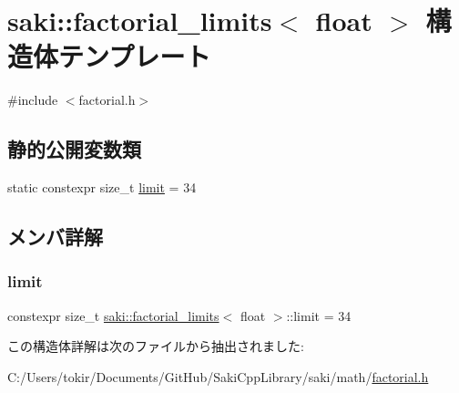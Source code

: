 \hypertarget{structsaki_1_1factorial__limits_3_01float_01_4}{}\section{saki\+:\+:factorial\+\_\+limits$<$ float $>$ 構造体テンプレート}
\label{structsaki_1_1factorial__limits_3_01float_01_4}


{\ttfamily \#include $<$factorial.\+h$>$}

\subsection*{静的公開変数類}
\begin{DoxyCompactItemize}
\item 
static constexpr size\+\_\+t \mbox{\hyperlink{structsaki_1_1factorial__limits_3_01float_01_4_a0ae26b8bc828a91c8e886ce9ba99ad13}{limit}} = 34
\end{DoxyCompactItemize}


\subsection{メンバ詳解}
\mbox{\label{structsaki_1_1factorial__limits_3_01float_01_4_a0ae26b8bc828a91c8e886ce9ba99ad13}} 
\subsubsection{\texorpdfstring{limit}{limit}}
{\footnotesize\ttfamily constexpr size\+\_\+t \mbox{\hyperlink{structsaki_1_1factorial__limits}{saki\+::factorial\+\_\+limits}}$<$ float $>$\+::limit = 34\hspace{0.3cm}{\ttfamily [static]}}



この構造体詳解は次のファイルから抽出されました\+:\begin{DoxyCompactItemize}
\item 
C\+:/\+Users/tokir/\+Documents/\+Git\+Hub/\+Saki\+Cpp\+Library/saki/math/\mbox{\hyperlink{factorial_8h}{factorial.\+h}}\end{DoxyCompactItemize}
